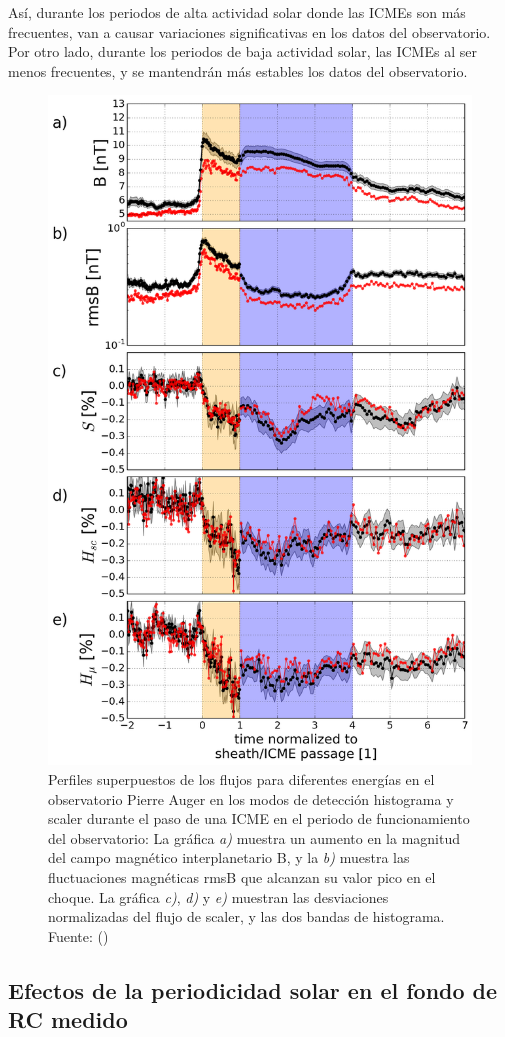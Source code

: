 Así, durante los periodos de alta actividad solar donde las ICMEs son más frecuentes, van a causar variaciones significativas en los datos del observatorio. Por otro lado, durante los periodos de baja actividad solar, las ICMEs al ser menos frecuentes, y se mantendrán más estables los datos del observatorio.
\begin{figure}
\centering
    \includegraphics[width=0.7\linewidth]{Figs/ICME_scaler.png}
    \caption{Perfiles superpuestos de los flujos para diferentes energías en el observatorio Pierre Auger en los modos de detección histograma y scaler durante el paso de una ICME en el periodo de funcionamiento del observatorio: La gráfica \textit{a)} muestra un aumento en la magnitud del campo magnético interplanetario B, y la \textit{b)} muestra las fluctuaciones magnéticas rmsB que alcanzan su valor pico en el choque. La gráfica \textit{c)}, \textit{d)} y \textit{e)} muestran las desviaciones normalizadas del flujo de scaler, y las dos bandas de histograma. Fuente: (\cite{masias_2017})}
    \label{fig:ICME_scaler}
\end{figure}
\subsection{Efectos de la periodicidad solar en el fondo de RC medido}


